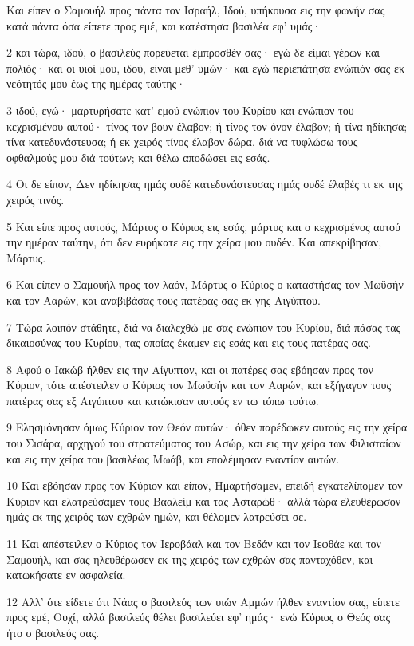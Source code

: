 \par Και είπεν ο Σαμουήλ προς πάντα τον Ισραήλ, Ιδού, υπήκουσα εις την φωνήν σας κατά πάντα όσα είπετε προς εμέ, και κατέστησα βασιλέα εφ' υμάς·
\par 2 και τώρα, ιδού, ο βασιλεύς πορεύεται έμπροσθέν σας· εγώ δε είμαι γέρων και πολιός· και οι υιοί μου, ιδού, είναι μεθ' υμών· και εγώ περιεπάτησα ενώπιόν σας εκ νεότητός μου έως της ημέρας ταύτης·
\par 3 ιδού, εγώ· μαρτυρήσατε κατ' εμού ενώπιον του Κυρίου και ενώπιον του κεχρισμένου αυτού· τίνος τον βουν έλαβον; ή τίνος τον όνον έλαβον; ή τίνα ηδίκησα; τίνα κατεδυνάστευσα; ή εκ χειρός τίνος έλαβον δώρα, διά να τυφλώσω τους οφθαλμούς μου διά τούτων; και θέλω αποδώσει εις εσάς.
\par 4 Οι δε είπον, Δεν ηδίκησας ημάς ουδέ κατεδυνάστευσας ημάς ουδέ έλαβές τι εκ της χειρός τινός.
\par 5 Και είπε προς αυτούς, Μάρτυς ο Κύριος εις εσάς, μάρτυς και ο κεχρισμένος αυτού την ημέραν ταύτην, ότι δεν ευρήκατε εις την χείρα μου ουδέν. Και απεκρίβησαν, Μάρτυς.
\par 6 Και είπεν ο Σαμουήλ προς τον λαόν, Μάρτυς ο Κύριος ο καταστήσας τον Μωϋσήν και τον Ααρών, και αναβιβάσας τους πατέρας σας εκ γης Αιγύπτου.
\par 7 Τώρα λοιπόν στάθητε, διά να διαλεχθώ με σας ενώπιον του Κυρίου, διά πάσας τας δικαιοσύνας του Κυρίου, τας οποίας έκαμεν εις εσάς και εις τους πατέρας σας.
\par 8 Αφού ο Ιακώβ ήλθεν εις την Αίγυπτον, και οι πατέρες σας εβόησαν προς τον Κύριον, τότε απέστειλεν ο Κύριος τον Μωϋσήν και τον Ααρών, και εξήγαγον τους πατέρας σας εξ Αιγύπτου και κατώκισαν αυτούς εν τω τόπω τούτω.
\par 9 Ελησμόνησαν όμως Κύριον τον Θεόν αυτών· όθεν παρέδωκεν αυτούς εις την χείρα του Σισάρα, αρχηγού του στρατεύματος του Ασώρ, και εις την χείρα των Φιλισταίων και εις την χείρα του βασιλέως Μωάβ, και επολέμησαν εναντίον αυτών.
\par 10 Και εβόησαν προς τον Κύριον και είπον, Ημαρτήσαμεν, επειδή εγκατελίπομεν τον Κύριον και ελατρεύσαμεν τους Βααλείμ και τας Ασταρώθ· αλλά τώρα ελευθέρωσον ημάς εκ της χειρός των εχθρών ημών, και θέλομεν λατρεύσει σε.
\par 11 Και απέστειλεν ο Κύριος τον Ιεροβάαλ και τον Βεδάν και τον Ιεφθάε και τον Σαμουήλ, και σας ηλευθέρωσεν εκ της χειρός των εχθρών σας πανταχόθεν, και κατωκήσατε εν ασφαλεία.
\par 12 Αλλ' ότε είδετε ότι Νάας ο βασιλεύς των υιών Αμμών ήλθεν εναντίον σας, είπετε προς εμέ, Ουχί, αλλά βασιλεύς θέλει βασιλεύει εφ' ημάς· ενώ Κύριος ο Θεός σας ήτο ο βασιλεύς σας.

